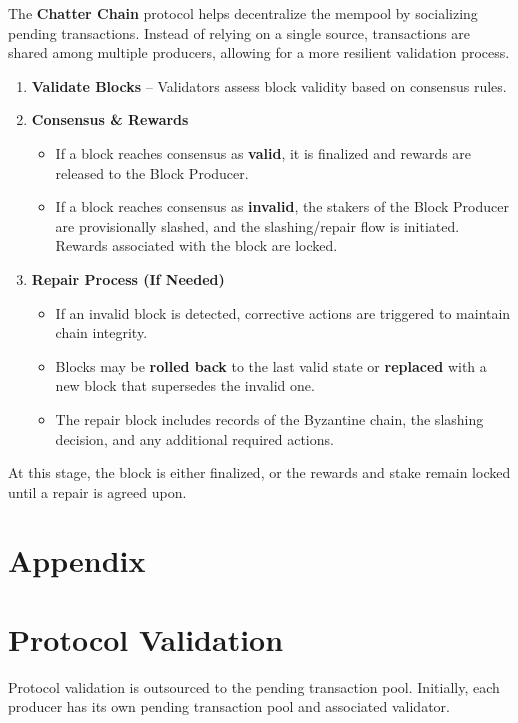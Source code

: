 \documentclass{article}
\begin{document}
The \textbf{Chatter Chain} protocol helps decentralize the mempool by
socializing pending transactions. Instead of relying on a single source,
transactions are shared among multiple producers, allowing for a more resilient
validation process.

\begin{enumerate}
    \item \textbf{Validate Blocks} – Validators assess block validity based on consensus rules.
    \item \textbf{Consensus \& Rewards}
          \begin{itemize}
              \item If a block reaches consensus as \textbf{valid}, it is finalized and rewards are
                    released to the Block Producer.
              \item If a block reaches consensus as \textbf{invalid}, the stakers of the Block
                    Producer are provisionally slashed, and the slashing/repair flow is initiated.
                    Rewards associated with the block are locked.
          \end{itemize}
    \item \textbf{Repair Process (If Needed)}
          \begin{itemize}
              \item If an invalid block is detected, corrective actions are triggered to maintain
                    chain integrity.
              \item Blocks may be \textbf{rolled back} to the last valid state or \textbf{replaced}
                    with a new block that supersedes the invalid one.
              \item The repair block includes records of the Byzantine chain, the slashing
                    decision, and any additional required actions.
          \end{itemize}
\end{enumerate}

At this stage, the block is either finalized, or the rewards and stake remain
locked until a repair is agreed upon.

\newpage
\section*{Appendix}
\appendix %
\section{Protocol Validation}
Protocol validation is outsourced to the pending transaction pool. Initially,
each producer has its own pending transaction pool and associated validator.
\end{document}
